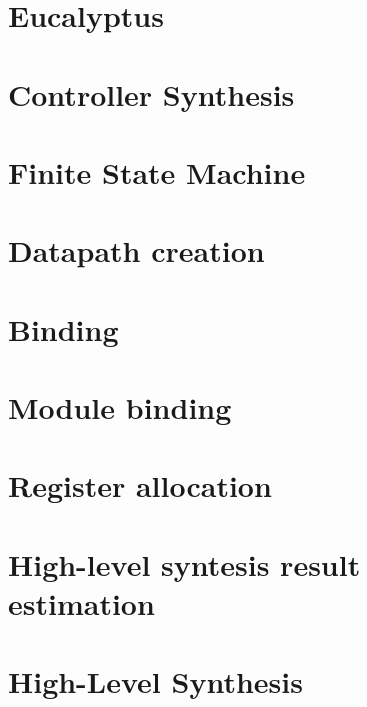 \documentclass[a4paper]{book}
\begin{document}
\chapter{Eucalyptus}
\label{src_eucalyptus}

\chapter{Controller Synthesis}
\label{src_HLS_controller_fsm}

\chapter{Finite State Machine}
\label{src_HLS_controller_stg}

\chapter{Datapath creation}
\label{src_HLS_datapath_page}

\chapter{Binding}
\label{src_HLS_binding_page}

\chapter{Module binding}
\label{src_HLS_module_binding_page}

\chapter{Register allocation}
\label{src_HLS_registerAllocation_page}

\chapter{High-\/level syntesis result estimation}
\label{src_HLS_estimation}

\chapter{High-\/\+Level Synthesis}
\label{src_HLS_page}

\end{document}
